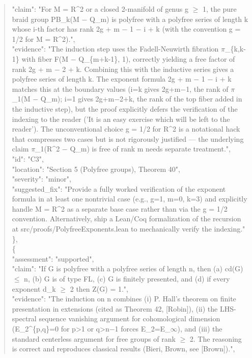 \documentclass[11pt]{article}
\begin{document}
\begin{quote}
      "claim": "For M = R\^{}2 or a closed 2-manifold of genus g \ensuremath{\ge} 1, the pure braid group PB\_k(M \ensuremath{-} Q\_m) is polyfree with a polyfree series of length k whose i-th factor has rank 2g + m \ensuremath{-} 1 \ensuremath{-} i + k (with the convention g = 1/2 for M = R\^{}2).",\\
      "evidence": "The induction step uses the Fadell-Neuwirth fibration \ensuremath{\pi}\_\{k,k-1\} with fiber F(M \ensuremath{-} Q\_\{m+k-1\}, 1), correctly yielding a free factor of rank 2g + m \ensuremath{-} 2 + k. Combining this with the inductive series gives a polyfree series of length k. The exponent formula 2g + m \ensuremath{-} 1 \ensuremath{-} i + k matches this at the boundary values (i=k gives 2g+m\ensuremath{-}1, the rank of \ensuremath{\pi}\_1(M \ensuremath{-} Q\_m); i=1 gives 2g+m\ensuremath{-}2+k, the rank of the top fiber added in the inductive step), but the proof explicitly defers the verification of the indexing to the reader ('It is an easy exercise which will be left to the reader'). The unconventional choice g = 1/2 for R\^{}2 is a notational hack that compresses two cases but is not rigorously justified --- the underlying claim \ensuremath{\pi}\_1(R\^{}2 \ensuremath{-} Q\_m) is free of rank m needs separate treatment.",\\
      "id": "C3",\\
      "location": "Section 5 (Polyfree groups), Theorem 40",\\
      "severity": "minor",\\
      "suggested\_fix": "Provide a fully worked verification of the exponent formula in at least one nontrivial case (e.g., g=1, m=0, k=3) and explicitly handle M = R\^{}2 as a separate base case rather than via the g = 1/2 convention. Alternatively, ship a Lean/Coq formalization of the recursion at src/proofs/PolyfreeExponents.lean to mechanically verify the indexing."\\
    \},\\
    \{\\
      "assessment": "supported",\\
      "claim": "If G is polyfree with a polyfree series of length n, then (a) cd(G) \ensuremath{\le} n, (b) G is of type FL, (c) G is finitely presented, and (d) if every exponent d\_k \ensuremath{\ge} 2 then Z(G) = 1.",\\
      "evidence": "The induction on n combines (i) P. Hall's theorem on finite presentation in extensions (cited as Theorem 42, [Robin]), (ii) the LHS-spectral sequence vanishing argument for cohomological dimension (E\_2\^{}\{p,q\}=0 for p>1 or q>n\ensuremath{-}1 forces E\_2=E\_\ensuremath{\infty}), and (iii) the standard centerless argument for free groups of rank \ensuremath{\ge} 2. The reasoning is correct and reproduces classical results (Bieri, Brown, see [Brown]).",\\

\end{quote}
\end{document}

